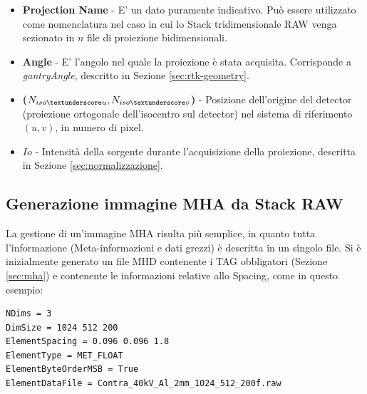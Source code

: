 \documentclass[a4paper,12pt, doubleside]{report}
\begin{document}
                    \begin{itemize}
                        \item \textbf{Projection Name} - E' un dato puramente indicativo. Può essere utilizzato come nomenclatura nel caso in cui lo Stack tridimensionale RAW venga sezionato in $n$ file di proiezione bidimensionali.
                        
                        \item \textbf{Angle} - E' l'angolo nel quale la proiezione è stata acquisita. Corrisponde a \textit{gantryAngle}, descritto in Sezione \ref{sec:rtk-geometry}.
                        
                        \item \textbf{($N_{iso\textunderscore u},N_{iso\textunderscore v}$)} - Posizione dell'origine del detector (proiezione ortogonale dell'isocentro sul detector) nel sistema di riferimento $(u,v)$, in numero di pixel.
                        
                        \item \textbf{$Io$} - Intensità della sorgente durante l'acquisizione della proiezione, descritta in Sezione \ref{sec:normalizzazione}.
                    \end{itemize}
                    
                    
                         
            \subsection{Generazione immagine MHA da Stack RAW}
                \label{sec:conversione}
                \par
                    La gestione di un'immagine MHA risulta più semplice, in quanto tutta l'informazione (Meta-informazioni e dati grezzi) è descritta in un singolo file. Si è inizialmente generato un file MHD contenente i TAG obbligatori (Sezione \ref{sec:mha}) e contenente le informazioni relative allo Spacing, come in questo esempio:
                    
                    \begin{lstlisting}[language=bash, frame=bt]
NDims = 3
DimSize = 1024 512 200
ElementSpacing = 0.096 0.096 1.8
ElementType = MET_FLOAT
ElementByteOrderMSB = True
ElementDataFile = Contra_40kV_Al_2mm_1024_512_200f.raw
                    \end{lstlisting}
                    
\end{document}
